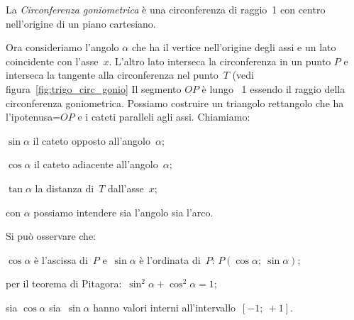 \begin{definizione}
 La \emph{Circonferenza goniometrica} è una circonferenza di raggio~1 con 
 centro nell'origine di un piano cartesiano.
\end{definizione}

Ora consideriamo l'angolo $\alpha$ che ha il vertice nell'origine degli assi 
e 
un lato coincidente con l'asse~$x$. L'altro lato interseca la circonferenza 
in 
un punto $P$ e interseca la tangente alla circonferenza nel punto~$T$
(vedi figura~\ref{fig:trigo_circ_gonio}
Il segmento $OP$ è lungo ~1 essendo il raggio della circonferenza 
goniometrica.
Possiamo costruire un triangolo rettangolo che ha l'ipotenusa=$OP$ e i cateti
paralleli agli assi. Chiamiamo:

\begin{itemize*}
 \item $\sin \alpha$ il cateto opposto all'angolo~$\alpha$;
 \item $\cos \alpha$ il cateto adiacente all'angolo~$\alpha$;
 \item $\tan \alpha$ la distanza di~$T$ dall'asse~$x$;
 \item con $\alpha$ possiamo intendere sia l'angolo sia l'arco.
\end{itemize*}



Si può osservare che:

\begin{itemize*}
 \item $\cos \alpha$ è l'ascissa di~$P$ e~$\sin \alpha$ è 
  l'ordinata di~$P$: $P \left(\cos \alpha;~\sin \alpha \right)$;
 \item per il teorema di Pitagora:~$\sin^2 \alpha + \cos^2 \alpha = 1$;
 \item sia $\cos \alpha$ sia~$\sin \alpha$ hanno valori interni
  all'intervallo~$\left[-1;~+1 \right]$.
\end{itemize*}



